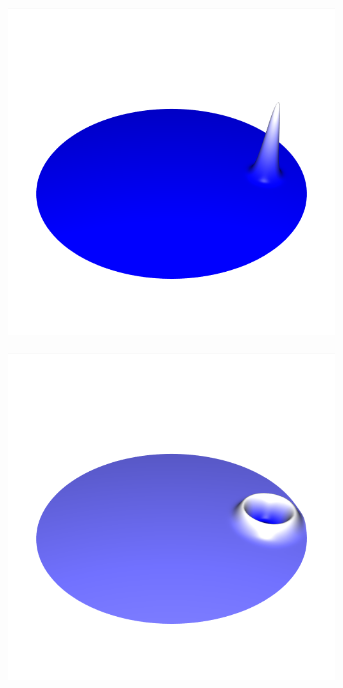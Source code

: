 \documentclass[crop=false,10pt,ngerman]{standalone}
\begin{document}
      \begin{figure}[h]
        \center
        \begin{subfigure}[b]{0.24\textwidth}
          \center
          \includegraphics[trim={1.5cm 3.05cm 1.5cm 5.2cm},clip,width=0.95\textwidth]{images/circle_wave_0.png}
          \caption{}
        \end{subfigure}
        \begin{subfigure}[b]{0.24\textwidth}
          \center
          \includegraphics[trim={1.5cm 3.05cm 1.5cm 5.2cm},clip,width=0.95\textwidth]{images/circle_wave_1.png}

\end{subfigure}
\end{figure}
\end{document}
